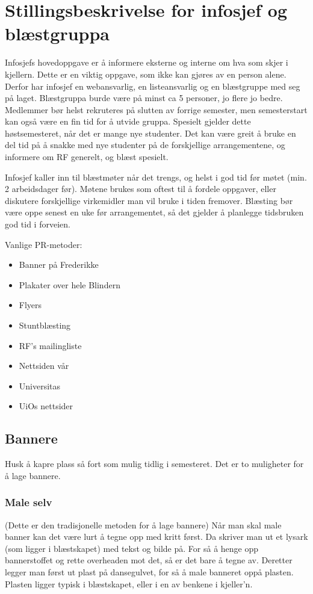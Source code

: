 \section{Stillingsbeskrivelse for infosjef og blæstgruppa}

Infosjefs hovedoppgave er å informere eksterne og interne om hva som skjer i kjellern.
Dette er en viktig oppgave, som ikke kan gjøres av en person alene.
Derfor har infosjef en webansvarlig, en listeansvarlig og en blæstgruppe med seg på laget.
Blæstgruppa burde være på minst ca 5 personer, jo flere jo bedre. Medlemmer bør helst rekruteres på slutten av forrige semester, men semesterstart kan også være en fin tid for å utvide gruppa. Spesielt gjelder dette høstsemesteret, når det er mange nye studenter. Det kan være greit å bruke en del tid på å snakke med nye studenter på de forskjellige arrangementene, og informere om RF generelt, og blæst spesielt.

Infosjef kaller inn til blæstmøter når det trengs, og helst i god tid før møtet
(min. 2 arbeidsdager før). Møtene brukes som oftest til å fordele oppgaver,
eller diskutere forskjellige virkemidler man vil bruke i tiden fremover.
Blæsting bør være oppe senest en uke før arrangementet, så det gjelder å planlegge
tidsbruken god tid i forveien.


Vanlige PR-metoder:
\begin{itemize}
\item Banner på Frederikke
\item Plakater over hele Blindern
\item Flyers
\item Stuntblæsting
\item RF's mailingliste
\item Nettsiden vår
\item Universitas
\item UiOs nettsider
\end{itemize}


\subsection{Bannere}
Husk å kapre plass så fort som mulig tidlig i semesteret. Det er to muligheter for å lage bannere.
\subsubsection{Male selv}
(Dette er den tradisjonelle metoden for å lage bannere)
Når man skal male banner kan det være lurt å tegne opp med kritt først. Da 
skriver man ut et lysark (som ligger i blæstskapet) med tekst og bilde på.
For så å henge opp bannerstoffet og rette overheaden mot det, så er det bare
å tegne av. Deretter legger man først ut plast på dansegulvet, for så å male
banneret oppå plasten. Plasten ligger typisk i blæstskapet, eller i en av 
benkene i kjeller'n.
